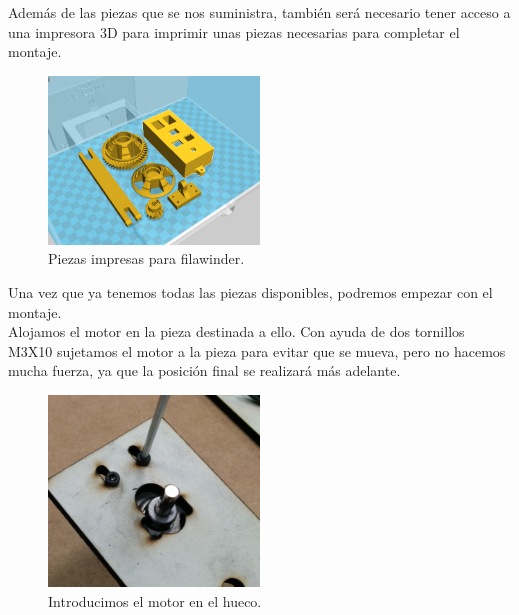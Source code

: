 Además de las piezas que se nos suministra, también será necesario tener acceso a una impresora 3D para imprimir unas piezas necesarias para completar el montaje.

    \begin{figure}[H]
            \centering
            \includegraphics[width=0.5\textwidth]{images/filawinder/piezas-impresas.png}
            \caption{Piezas impresas para filawinder.}
            \label{fig:winder_piezas}
    \end{figure}

 Una vez que ya tenemos todas las piezas disponibles, podremos empezar con el montaje.\\

Alojamos el motor en la pieza destinada a ello. Con ayuda de dos tornillos M3X10 sujetamos el motor a la pieza para evitar que se mueva, pero no hacemos mucha fuerza, ya que la posición final se realizará más adelante.

    \begin{figure}[H]
            \centering
            \includegraphics[width=0.5\textwidth]{images/filawinder/montaje1.png}
            \caption{Introducimos el motor en el hueco.}
            \label{fig:winder_piezas}
    \end{figure}


